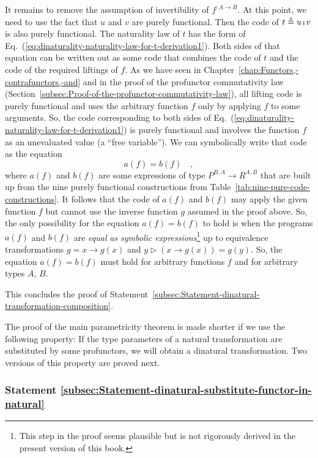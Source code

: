 It remains to remove the assumption of invertibility of $f^{:A\rightarrow B}$.
At this point, we need to use the fact that $u$ and $v$ are purely
functional. Then the code of $t\triangleq u\bef v$ is also purely
functional. The naturality law of $t$ has the form of Eq.~(\ref{eq:dinaturality-naturality-law-for-t-derivation1}).
Both sides of that equation can be written out as some code that combines
the code of $t$ and the code of the required liftings of $f$. As
we have seen in Chapter~\ref{chap:Functors,-contrafunctors,-and}
and in the proof of the profunctor commutativity law (Section~\ref{subsec:Proof-of-the-profunctor-commutativity-law}),
all lifting code is purely functional and uses the arbitrary function
$f$ only by applying $f$ to some arguments. So, the code corresponding
to both sides of Eq.~(\ref{eq:dinaturality-naturality-law-for-t-derivation1})
is purely functional and involves the function $f$ as an unevaluated
value (a \textsf{``}free variable\textsf{''}). We can symbolically write that code
as the equation 
\[
a(f)=b(f)\quad,
\]
where $a(f)$ and $b(f)$ are some expressions of type $P^{B,A}\rightarrow R^{A,B}$
that are built up from the nine purely functional constructions from
Table~\ref{tab:nine-pure-code-constructions}. It follows that the
code of $a(f)$ and $b(f)$ may apply the given function $f$ but
cannot use the inverse function $g$ assumed in the proof above. So,
the only possibility for the equation $a(f)=b(f)$ to hold is when
the programs $a(f)$ and $b(f)$ are \emph{equal} \emph{as symbolic
expressions}\footnote{This step in the proof seems plausible but is not rigorously derived
in the present version of this book.} up to equivalence transformations $g=x\rightarrow g(x)$ and $y\triangleright(x\rightarrow g(x))=g(y)$.
So, the equation $a(f)=b(f)$ must hold for arbitrary functions $f$
and for arbitrary types $A$, $B$. 

This concludes the proof of Statement~\ref{subsec:Statement-dinatural-transformation-composition}.

The proof of the main parametricity theorem is made shorter if we
use the following property: If the type parameters of a natural transformation
are substituted by some profunctors, we will obtain a dinatural transformation.
Two versions of this property are proved next.

\subsubsection{Statement \label{subsec:Statement-dinatural-substitute-functor-in-natural}\ref{subsec:Statement-dinatural-substitute-functor-in-natural}}

